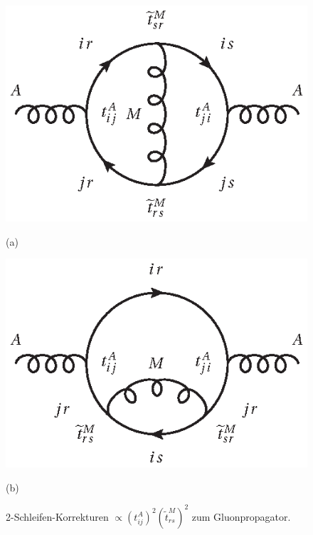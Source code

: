 \begin{figure}[h]
\begin{minipage}[t]{0.5 \textwidth}
 \includegraphics{abschnitte/n-schleifen/fig/QCDxdQCD1.eps}
 \caption*{(a)}
\end{minipage}
\begin{minipage}[t]{0.5\textwidth}
 \includegraphics{abschnitte/n-schleifen/fig/QCDxdQCD2var.eps}
 \caption*{(b)}
 \end{minipage}
 \caption{2-Schleifen-Korrekturen $\propto (t^A_{ij})^2(\widetilde{t}^M_{rs})^2$ zum Gluonpropagator.}\label{fig:n-schleifen:QCDxdQCD2}
\end{figure}